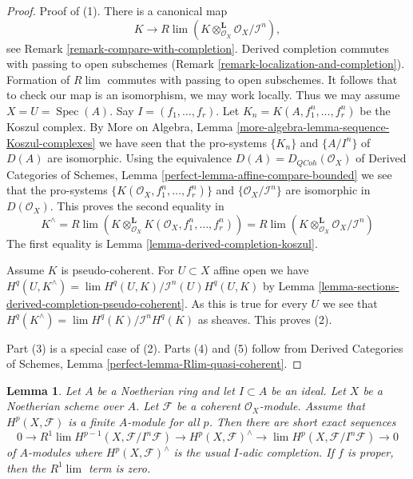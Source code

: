 \documentclass{stacks-project}
\theoremstyle{plain}
\newtheorem{lemma}[subsection]{Lemma}
\theoremstyle{definition}
\theoremstyle{remark}
\numberwithin{equation}{subsection}
\def\lim{\mathop{\mathrm{lim}}\nolimits}
\def\Spec{\mathop{\mathrm{Spec}}}
\def\QCoh{\mathit{QCoh}}
\begin{document}
\begin{proof}
Proof of (1). There is a canonical map
$$
K \longrightarrow
R\lim (K \otimes_{\mathcal{O}_X}^\mathbf{L} \mathcal{O}_X/\mathcal{I}^n),
$$
see Remark \ref{remark-compare-with-completion}.
Derived completion commutes with passing to open subschemes
(Remark \ref{remark-localization-and-completion}).
Formation of $R\lim$ commutes with passing to open subschemes.
It follows that to check our map is an isomorphism, we may work locally.
Thus we may assume $X = U = \Spec(A)$.
Say $I = (f_1, \ldots, f_r)$. Let
$K_n = K(A, f_1^n, \ldots, f_r^n)$ be the Koszul complex.
By More on Algebra, Lemma \ref{more-algebra-lemma-sequence-Koszul-complexes}
we have seen that the pro-systems $\{K_n\}$ and
$\{A/I^n\}$ of $D(A)$ are isomorphic.
Using the equivalence $D(A) = D_{\QCoh}(\mathcal{O}_X)$
of Derived Categories of Schemes, Lemma
\ref{perfect-lemma-affine-compare-bounded}
we see that the pro-systems $\{K(\mathcal{O}_X, f_1^n, \ldots, f_r^n)\}$
and $\{\mathcal{O}_X/\mathcal{I}^n\}$ are isomorphic in
$D(\mathcal{O}_X)$. This proves the second equality in
$$
K^\wedge = R\lim \left(
K \otimes_{\mathcal{O}_X}^\mathbf{L} K(\mathcal{O}_X, f_1^n, \ldots, f_r^n)
\right) =
R\lim (K \otimes_{\mathcal{O}_X}^\mathbf{L} \mathcal{O}_X/\mathcal{I}^n)
$$
The first equality is
Lemma \ref{lemma-derived-completion-koszul}.

\medskip\noindent
Assume $K$ is pseudo-coherent. For $U \subset X$ affine open
we have $H^q(U, K^\wedge) = \lim H^q(U, K)/\mathcal{I}^n(U)H^q(U, K)$
by Lemma \ref{lemma-sections-derived-completion-pseudo-coherent}.
As this is true for every $U$ we see that
$H^q(K^\wedge) = \lim H^q(K)/\mathcal{I}^nH^q(K)$ as sheaves.
This proves (2).

\medskip\noindent
Part (3) is a special case of (2).
Parts (4) and (5) follow from
Derived Categories of Schemes, Lemma
\ref{perfect-lemma-Rlim-quasi-coherent}.
\end{proof}

\begin{lemma}
\label{lemma-formal-functions}
Let $A$ be a Noetherian ring and let $I \subset A$ be an ideal. Let $X$ be a
Noetherian scheme over $A$. Let $\mathcal{F}$ be a coherent
$\mathcal{O}_X$-module. Assume that $H^p(X, \mathcal{F})$ is
a finite $A$-module for all $p$. Then there are short exact sequences
$$
0 \to R^1\lim H^{p - 1}(X, \mathcal{F}/I^n\mathcal{F}) \to
H^p(X, \mathcal{F})^\wedge \to \lim H^p(X, \mathcal{F}/I^n\mathcal{F}) \to 0
$$
of $A$-modules where $H^p(X, \mathcal{F})^\wedge$ is the usual $I$-adic
completion. If $f$ is proper, then the $R^1\lim$ term is zero.
\end{lemma}
\end{document}
